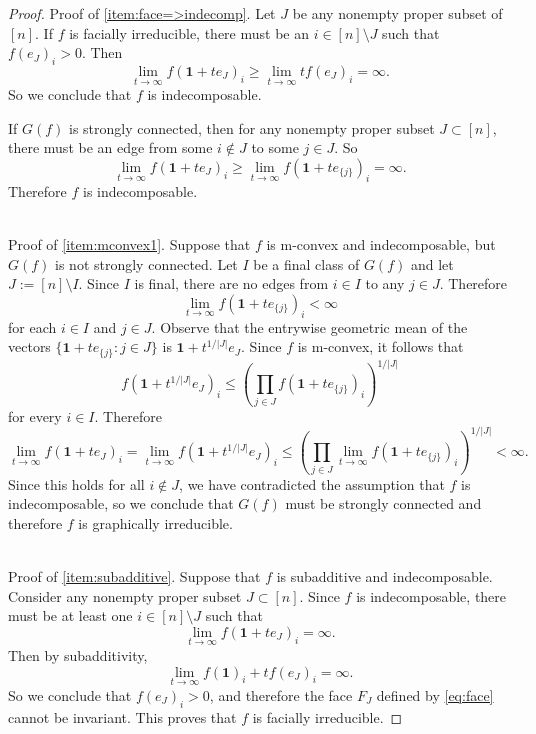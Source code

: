 \documentclass[10pt,a4paper]{amsart}
\newcommand{\bs}{\setminus}
\begin{document}
\begin{proof}
Proof of \eqref{item:face=>indecomp}.  Let $J$ be any nonempty proper subset of $[n]$. If $f$ is facially irreducible, there must be an $i \in [n] \bs J$ such that $f(e_J)_i > 0$. Then 
$$\lim_{t \rightarrow \infty} f(\mathbf{1} + t e_J)_i \ge \lim_{t \rightarrow \infty} t f(e_J)_i = \infty.$$
So we conclude that $f$ is indecomposable.  

If $G(f)$ is strongly connected, then for any nonempty proper subset $J \subset [n]$, there must be an edge from some $i \notin J$ to some $j \in J$.  So 
$$\lim_{t \rightarrow \infty} f(\mathbf{1} + t e_J)_i \ge \lim_{t \rightarrow \infty} f(\mathbf{1} + t e_{\{j\}})_i = \infty.$$
Therefore $f$ is indecomposable. 

~\\
Proof of \eqref{item:mconvex1}. 
Suppose that $f$ is m-convex and indecomposable, but $G(f)$ is not strongly connected.  Let $I$ be a final class of $G(f)$ and let $J := [n] \bs I$.  Since $I$ is final, there are no edges from $i \in I$ to any $j \in J$.  Therefore 
$$\lim_{t \rightarrow \infty} f(\mathbf{1} + t e_{\{j\}})_i < \infty$$
for each $i \in I$ and $j \in J$.  
Observe that the entrywise geometric mean of the vectors $\{ \mathbf{1} + t e_{\{j\}} : j \in J\}$ is $\mathbf{1} + t^{1/|J|} e_J$. Since $f$ is m-convex, it follows that 
$$f(\mathbf{1} + t^{1/|J|} e_J)_i  \le \left( \prod_{j \in J} f(\mathbf{1} + t e_{\{j\}})_i \right)^{1/|J|}$$
for every $i \in I$. Therefore 
$$\lim_{t \rightarrow \infty} f(\mathbf{1} + t e_J)_i =\lim_{t \rightarrow \infty} f(\mathbf{1} + t^{1/|J|} e_J)_i  \le \left( \prod_{j \in J} \lim_{t \rightarrow \infty} f(\mathbf{1} + t e_{\{j\}})_i \right)^{1/|J|} < \infty.$$
Since this holds for all $i \notin J$, we have contradicted the assumption that $f$ is indecomposable, so we conclude that $G(f)$ must be strongly connected and therefore $f$ is graphically irreducible.  


~\\
Proof of \eqref{item:subadditive}.
Suppose that $f$ is subadditive and indecomposable.  Consider any nonempty proper subset $J \subset [n]$. 
Since $f$ is indecomposable, there must be at least one $i \in [n] \bs J$ such that 
$$\lim_{t \rightarrow \infty} f(\mathbf{1} + te_J)_i  = \infty.$$
Then by subadditivity, 
$$\lim_{t \rightarrow \infty} f(\mathbf{1})_i + tf(e_J)_i  = \infty.$$
So we conclude that $f(e_J)_i > 0$, and therefore the face $F_J$ defined by \eqref{eq:face} cannot be invariant.  This proves that $f$ is facially irreducible. %
\end{proof}
\end{document}
